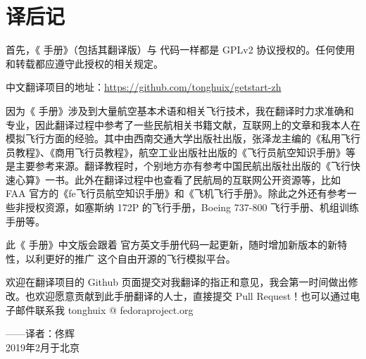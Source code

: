 \newpage
\section{译后记}

首先，《\FlightGear{} 手册》（包括其翻译版）与 \FligtGear{} 代码一样都是 GPLv2 协议授权的。任何使用和转载都应遵守此授权的相关规定。

中文翻译项目的地址：\url{https://github.com/tonghuix/getstart-zh}

因为《\FlightGear{} 手册》涉及到大量航空基本术语和相关飞行技术，我在翻译时力求准确和专业，因此翻译过程中参考了一些民航相关书籍文献，互联网上的文章和我本人在模拟飞行方面的经验。其中由西南交通大学出版社出版，张泽龙主编的《私用飞行员教程》、《商用飞行员教程》，航空工业出版社出版的《飞行员航空知识手册》等是主要参考来源。翻译教程时，个别地方亦有参考中国民航出版社出版的《飞行快速心算》一书。此外在翻译过程中也查看了民航局的互联网公开资源等，比如 FAA 官方的《fe飞行员航空知识手册》和《飞机飞行手册》。除此之外还有参考一些非授权资源，如塞斯纳 172P 的飞行手册，Boeing 737-800 飞行手册、机组训练手册等。

此《\FlightGear{} 手册》中文版会跟着 \FlightGear{} 官方英文手册代码一起更新，随时增加新版本的新特性，以利更好的推广 \FlightGear{} 这个自由开源的飞行模拟平台。

欢迎在翻译项目的 Github 页面提交对我翻译的指正和意见，我会第一时间做出修改。也欢迎愿意贡献到此手册翻译的人士，直接提交 Pull Request！也可以通过电子邮件联系我 tonghuix @ fedoraproject.org

\begin{flushright}
——译者：佟辉\\
2019年2月于北京
\end{flushright}


\fi
\iffalse
